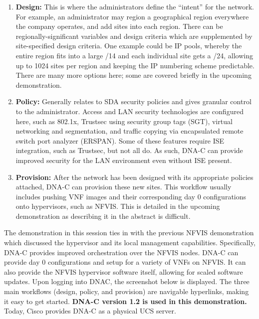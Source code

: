 \begin{enumerate}
  \item \textbf{Design:} This is where the administrators define the ``intent'' for the
  network. For example, an administrator may region a geographical region
  everywhere the company operates, and add sites into each region. There can be
  regionally-significant variables and design criteria which are supplemented by
  site-specified design criteria. One example could be IP pools, whereby the
  entire region fits into a large /14 and each individual site gets a /24,
  allowing up to 1024 sites per region and keeping the IP numbering scheme
  predictable. There are many more options here; some are covered briefly in the
  upcoming demonstration.
  \item \textbf{Policy:} Generally relates to SDA security policies and gives granular
  control to the administrator. Access and LAN security technologies are
  configured here, such as 802.1x, Trustsec using security group tags (SGT),
  virtual networking and segmentation, and traffic copying via encapsulated
  remote switch port analyzer (ERSPAN). Some of these features require ISE
  integration, such as Trustsec, but not all do. As such, DNA-C can provide
  improved security for the LAN environment even without ISE present.
  \item \textbf{Provision:} After the network has been designed with its appropriate
  policies attached, DNA-C can provision these new sites. This workflow usually
  includes pushing VNF images and their corresponding day 0 configurations onto
  hypervisors, such as NFVIS\@. This is detailed in the upcoming demonstration as
  describing it in the abstract is difficult.
\end{enumerate}

The demonstration in this session ties in with the previous NFVIS
demonstration which discussed the hypervisor and its local management
capabilities. Specifically, DNA-C provides improved orchestration over the
NFVIS nodes. DNA-C can provide day 0 configurations and setup for a variety of
VNFs on NFVIS\@. It can also provide the NFVIS hypervisor software itself,
allowing for scaled software updates. Upon logging into DNAC, the screenshot
below is displayed. The three main workflows (design, policy, and provision)
are navigable hyperlinks, making it easy to get started. \textbf{DNA-C version 1.2
is used in this demonstration.} Today, Cisco provides DNA-C as a physical UCS
server.


